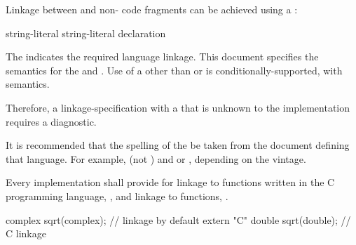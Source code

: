 \pnum
Linkage between \Cpp{} and  non-\Cpp{} code fragments can
be achieved using a :

%
%
%
\begin{bnf}
\br
     string-literal \terminal{\{}  \terminal{\}}\br
     string-literal declaration
\end{bnf}

The  indicates the required language linkage.
This document specifies the semantics for the
  and . Use of a
 other than  or  is
conditionally-supported, with  semantics.
\begin{note}
Therefore, a linkage-specification with a  that
is unknown to the implementation requires a diagnostic.
\end{note}
\begin{note}
It is recommended that the spelling of the  be
taken from the document defining that language. For example, 
(not ) and  or , depending on
the vintage.
\end{note}

\pnum
{}%
Every implementation shall provide for linkage to functions written in
the C programming language,
%
, and linkage to \Cpp{} functions, .
\begin{example}
\begin{codeblock}
complex sqrt(complex);          // \Cpp{} linkage by default
extern "C" {
  double sqrt(double);          // C linkage
}
\end{codeblock}
\end{example}

